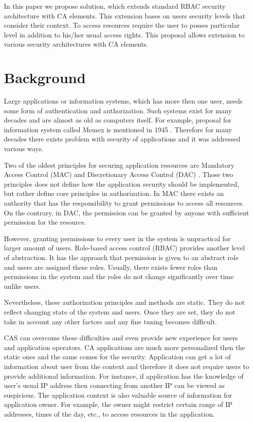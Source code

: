 \documentclass{sig-alternate}
\begin{document}
In this paper we propose solution, which extends standard RBAC security architecture with CA elements. This extension bases on users security levels that consider their context. To access resources require the user to posses particular level in addition to his/her usual access rights. This proposal allows extension to various security architectures with CA elements.

\section{Background}
Large applications or information systems, which has more then one user, needs some form of authentication and authorization. Such systems exist for many decades and are almost as old as computers itself. For example, proposal for information system called Memex is mentioned in 1945 \cite{memex}. Therefore for many decades there exists problem with security of applications and it was addressed various ways.

Two of the oldest principles for securing application resources are Mandatory Access Control (MAC) \cite{accesscontrol} and Discretionary Access Control (DAC) \cite{accesscontrol}. Those two principles does not define how the application security should be implemented, but rather define core principles in authorization. In MAC there exists an authority that has the responsibility to grant permissions to access all resources. On the contrary, in DAC, the permission can be granted by anyone with sufficient permission for the resource.

However, granting permissions to every user in the system is unpractical for larger amount of users. Role-based access control (RBAC) \cite{rbac} provides another level of abstraction. It has the approach that permission is given to an abstract role and users are assigned these roles. Usually, there exists fewer roles than permissions in the system and the roles do not change significantly over time unlike users.

Nevertheless, these authorization principles and methods are static. They do not reflect changing state of the system and users. Once they are set, they do not take in account any other factors and any fine tuning becomes difficult.

CAS can overcome these difficulties and even provide new experience for users and application operators. CA applications are much more personalized then the static ones and the same comes for the security. Application can get a lot of information about user from the context and therefore it does not require users to provide additional information. For instance, if application has the knowledge of user's usual IP address then connecting from another IP can be viewed as suspicious. The application context is also valuable source of information for application owner. For example, the owner might restrict certain range of IP addresses, times of the day, etc., to access resources in the application. 
\end{document}
